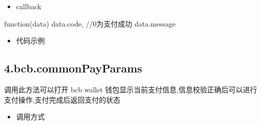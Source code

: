 \documentclass[letterpaper,10pt,english]{sphinxmanual}
\begin{document}
\begin{sphinxVerbatim}[commandchars=\\\{\}]
     
\end{sphinxVerbatim}
\begin{itemize}
\item {} 
callback

\end{itemize}

\begin{sphinxVerbatim}[commandchars=\\\{\}]
function(data) \PYGZob{}
  data.code, //0为支付成功
      data.message
\PYGZcb{}
\end{sphinxVerbatim}
\begin{itemize}
\item {} 
代码示例

\end{itemize}

\begin{sphinxVerbatim}[commandchars=\\\{\}]
 
   
\end{sphinxVerbatim}


\subsection{4.bcb.commonPayParams}
\label{\detokenize{jsapi:bcb-commonpayparams}}
调用此方法可以打开 bcb wallet
钱包显示当前支付信息,信息校验正确后可以进行支付操作,支付完成后返回支付的状态
\begin{itemize}
\item {} 
调用方式

\end{itemize}
\end{document}
